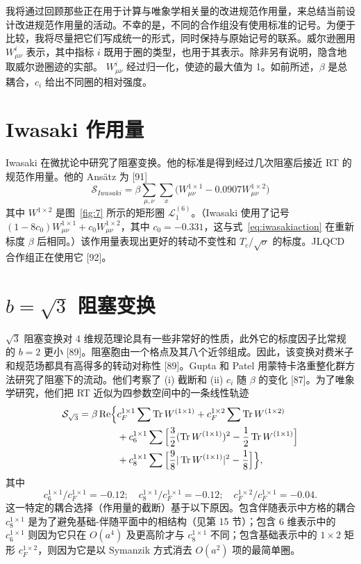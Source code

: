 我将通过回顾那些正在用于计算与唯象学相关量的改进规范作用量，来总结当前设计改进规范作用量的活动。不幸的是，不同的合作组没有使用标准的记号。为便于比较，我将尽量把它们写成统一的形式，同时保持与原始记号的联系。威尔逊圈用 $W^i_{\mu\nu}$ 表示，其中指标 $i$ 既用于圈的类型，也用于其表示。除非另有说明，隐含地取威尔逊圈迹的实部。
$W^i_{\mu\nu}$ 经过归一化，使迹的最大值为 1。如前所述，$\beta$ 是总耦合，$c_i$ 给出不同圈的相对强度。

\section{Iwasaki 作用量}

Iwasaki 在微扰论中研究了阻塞变换。他的标准是得到经过几次阻塞后接近 RT 的规范作用量。他的 Ans\"atz 为 [91]
\begin{equation}
\mathcal{S}_{Iwasaki} = \beta\sum_{\mu,\nu}\sum_x
    \bigg(W^{1\times1}_{\mu\nu} - 0.0907W^{1\times2}_{\mu\nu}\bigg)
\label{eq:iwasakiaction}
\end{equation}
其中 $W^{1\times2}$ 是图~\ref{fig:7} 所示的矩形圈 $\mathcal{L}_1^{(6)}$。（Iwasaki 使用了记号
$(1-8c_0)W^{1\times1}_{\mu\nu} + c_0W^{1\times2}_{\mu\nu}$，其中
$c_0 = -0.331$，这与式~\ref{eq:iwasakiaction} 在重新标度 $\beta$ 后相同。）该作用量表现出更好的转动不变性和 $T_c/\sqrt{\sigma}$ 的标度。JLQCD 合作组正在使用它 [92]。

\section{$b=\sqrt{3}$ 阻塞变换}

$\sqrt{3}$ 阻塞变换对 4 维规范理论具有一些非常好的性质，此外它的标度因子比常规的 $b = 2$ 更小 [89]。阻塞胞由一个格点及其八个近邻组成。因此，该变换对费米子和规范场都具有高得多的转动对称性 [89]。Gupta 和 Patel 用蒙特卡洛重整化群方法研究了阻塞下的流动。他们考察了 (i) 截断和 (ii) $c_i$ 随 $\beta$ 的变化 [87]。为了唯象学研究，他们把 RT 近似为四参数空间中的一条线性轨迹
\begin{equation}
\begin{aligned}
\mathcal{S}_{\sqrt{3}} = \beta\,\mathrm{Re}\Big\{&
    c_F^{1\times1}\sum\Tr W^{(1\times1)}
    + c_F^{1\times2}\sum\Tr W^{(1\times2)}\\
    &+ c_6^{1\times1}\sum\Big[\frac{3}{2}(\Tr W^{(1\times1)})^2
        - \frac{1}{2}\Tr W^{(1\times1)}\Big]\\
    &+ c_8^{1\times1}\sum\Big[\frac{9}{8}|\Tr W^{(1\times1)}|^2
        - \frac{1}{8}\Big]\Big\},
\end{aligned}
\label{eq:rootthreedef}
\end{equation}
其中
\begin{equation}
c_6^{1\times1}/c_F^{1\times1} = -0.12;\quad
c_8^{1\times1}/c_F^{1\times1} = -0.12;\quad
c_F^{1\times2}/c_F^{1\times1} = -0.04.
\label{eq:rootthreerat}
\end{equation}
这一特定的耦合选择（作用量的截断）基于以下原因。包含伴随表示中方格的耦合 $c_8^{1\times1}$ 是为了避免基础-伴随平面中的相结构（见第 15 节）；包含 6 维表示中的 $c_6^{1\times1}$ 则因为它只在 $O(a^4)$ 及更高阶才与 $c_8^{1\times1}$ 不同；包含基础表示中的 $1\times2$ 矩形 $c_F^{1\times2}$，则因为它是以 Symanzik 方式消去 $O(a^2)$ 项的最简单圈。

